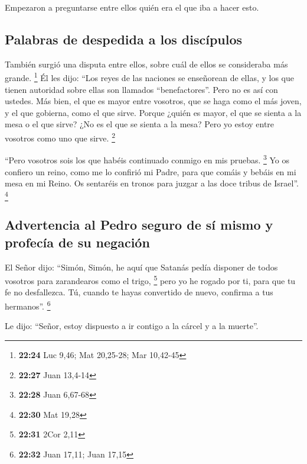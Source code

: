  Empezaron a preguntarse entre ellos quién era el que iba
a hacer esto.

\hypertarget{palabras-de-despedida-a-los-discuxedpulos}{%
\subsection{Palabras de despedida a los
discípulos}\label{palabras-de-despedida-a-los-discuxedpulos}}

 También surgió una disputa entre ellos, sobre cuál de
ellos se consideraba más grande. \footnote{\textbf{22:24} Luc 9,46; Mat
  20,25-28; Mar 10,42-45}  Él les dijo: ``Los reyes de
las naciones se enseñorean de ellas, y los que tienen autoridad sobre
ellas son llamados ``benefactores''.  Pero no es así con
ustedes. Más bien, el que es mayor entre vosotros, que se haga como el
más joven, y el que gobierna, como el que sirve.  Porque
¿quién es mayor, el que se sienta a la mesa o el que sirve? ¿No es el
que se sienta a la mesa? Pero yo estoy entre vosotros como uno que
sirve. \footnote{\textbf{22:27} Juan 13,4-14}

 ``Pero vosotros sois los que habéis continuado conmigo
en mis pruebas. \footnote{\textbf{22:28} Juan 6,67-68} 
Yo os confiero un reino, como me lo confirió mi Padre, 
para que comáis y bebáis en mi mesa en mi Reino. Os sentaréis en tronos
para juzgar a las doce tribus de Israel''. \footnote{\textbf{22:30} Mat
  19,28}

\hypertarget{advertencia-al-pedro-seguro-de-suxed-mismo-y-profecuxeda-de-su-negaciuxf3n}{%
\subsection{Advertencia al Pedro seguro de sí mismo y profecía de su
negación}\label{advertencia-al-pedro-seguro-de-suxed-mismo-y-profecuxeda-de-su-negaciuxf3n}}

 El Señor dijo: ``Simón, Simón, he aquí que Satanás pedía
disponer de todos vosotros para zarandearos como el trigo, \footnote{\textbf{22:31}
  2Cor 2,11}  pero yo he rogado por ti, para que tu fe no
desfallezca. Tú, cuando te hayas convertido de nuevo, confirma a tus
hermanos''. \footnote{\textbf{22:32} Juan 17,11; Juan 17,15}

 Le dijo: ``Señor, estoy dispuesto a ir contigo a la
cárcel y a la muerte''.

